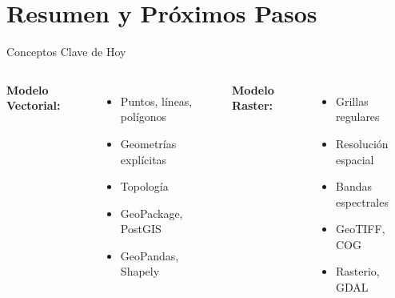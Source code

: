 \documentclass[10pt]{beamer}
\begin{document}
\section{Resumen y Próximos Pasos}

\begin{frame}{Conceptos Clave de Hoy}
    \begin{columns}
        \textbf{Modelo Vectorial:}
        \begin{itemize}
            \item Puntos, líneas, polígonos
            \item Geometrías explícitas
            \item Topología
            \item GeoPackage, PostGIS
            \item GeoPandas, Shapely
        \end{itemize}
        
        \textbf{Modelo Raster:}
        \begin{itemize}
            \item Grillas regulares
            \item Resolución espacial
            \item Bandas espectrales
            \item GeoTIFF, COG
            \item Rasterio, GDAL
        \end{itemize}
    \end{columns}
    
    \vspace{0.5cm}
    
    \begin{center}
    \end{center}
\end{frame}
\end{document}
